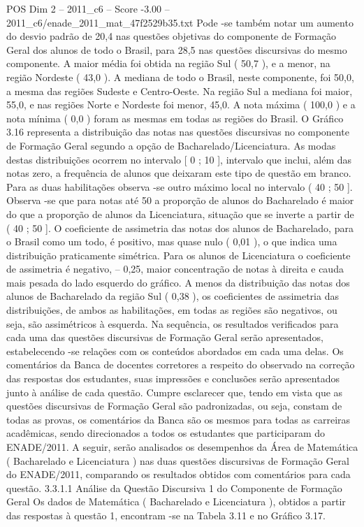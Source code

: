 \begin{textsample}{POS Dim 2 – 2011\_c6 – Score -3.00 – 2011\_c6/enade\_2011\_mat\_47f2529b35.txt}
Pode -se também notar um aumento do desvio padrão de 20,4 nas questões objetivas do componente de Formação Geral dos alunos de todo o Brasil, para 28,5 nas questões discursivas do mesmo componente.
A maior média foi obtida na região Sul ( 50,7 ), e a menor, na região Nordeste ( 43,0 ).
A mediana de todo o Brasil, neste componente, foi 50,0, a mesma das regiões Sudeste e Centro-Oeste.
Na região Sul a mediana foi maior, 55,0, e nas regiões Norte e Nordeste foi menor, 45,0.
A nota máxima ( 100,0 ) e a nota mínima ( 0,0 ) foram as mesmas em todas as regiões do Brasil.
O Gráfico 3.16 representa a distribuição das notas nas questões discursivas no componente de Formação Geral segundo a opção de Bacharelado/Licenciatura.
As modas destas distribuições ocorrem no intervalo [ 0 ; 10 ], intervalo que inclui, além das notas zero, a frequência de alunos que deixaram este tipo de questão em branco.
Para as duas habilitações observa -se outro máximo local no intervalo ( 40 ; 50 ].
Observa -se que para notas até 50 a proporção de alunos do Bacharelado é maior do que a proporção de alunos da Licenciatura, situação que se inverte a partir de ( 40 ; 50 ].
O coeficiente de assimetria das notas dos alunos de Bacharelado, para o Brasil como um todo, é positivo, mas quase nulo ( 0,01 ), o que indica uma distribuição praticamente simétrica.
Para os alunos de Licenciatura o coeficiente de assimetria é negativo, – 0,25, maior concentração de notas à direita e cauda mais pesada do lado esquerdo do gráfico.
A menos da distribuição das notas dos alunos de Bacharelado da região Sul ( 0,38 ), os coeficientes de assimetria das distribuições, de ambos as habilitações, em todas as regiões são negativos, ou seja, são assimétricos à esquerda.
Na sequência, os resultados verificados para cada uma das questões discursivas de Formação Geral serão apresentados, estabelecendo -se relações com os conteúdos abordados em cada uma delas.
Os comentários da Banca de docentes corretores a respeito do observado na correção das respostas dos estudantes, suas impressões e conclusões serão apresentados junto à análise de cada questão.
Cumpre esclarecer que, tendo em vista que as questões discursivas de Formação Geral são padronizadas, ou seja, constam de todas as provas, os comentários da Banca são os mesmos para todas as carreiras acadêmicas, sendo direcionados a todos os estudantes que participaram do ENADE/2011.
A seguir, serão analisados os desempenhos da Área de Matemática ( Bacharelado e Licenciatura ) nas duas questões discursivas de Formação Geral do ENADE/2011, comparando os resultados obtidos com comentários para cada questão. 3.3.1.1 Análise da Questão Discursiva 1 do Componente de Formação Geral Os dados de Matemática ( Bacharelado e Licenciatura ), obtidos a partir das respostas à questão 1, encontram -se na Tabela 3.11 e no Gráfico 3.17.

\end{textsample}
